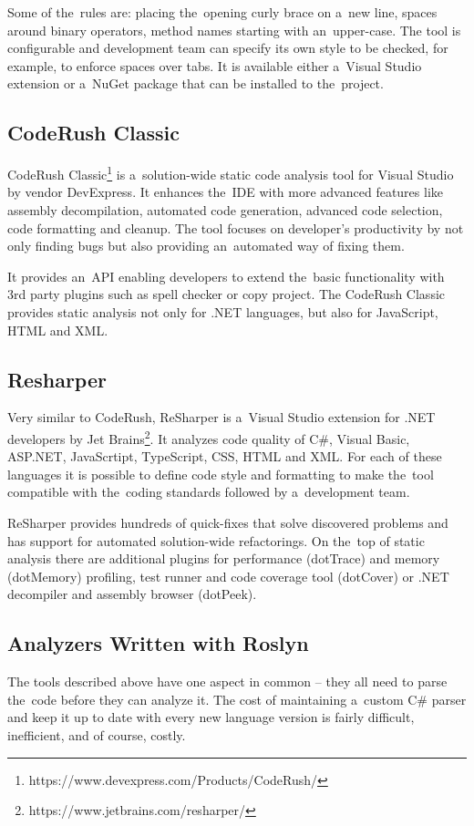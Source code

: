 \documentclass[
  digital, %
  table,   %
  lof,     %
  lot,     %
  oneside,
]{fithesis3}
\begin{document}
Some of the~rules are: placing the~opening curly brace on a~new line, spaces around binary operators, method names starting with an~upper-case. The tool is configurable and development team can specify its own style to be checked, for example, to enforce spaces over tabs. It is available either a~Visual Studio extension or a~NuGet package that can be installed to the~project.

\subsection{CodeRush Classic}
CodeRush Classic\footnote{https://www.devexpress.com/Products/CodeRush/} is a~solution-wide static code analysis tool for Visual Studio by vendor DevExpress. It enhances the~IDE with more advanced features like assembly decompilation, automated code generation, advanced code selection, code formatting and cleanup. The tool focuses on developer's productivity by not only finding bugs but also providing an~automated way of fixing them.

It provides an~API enabling developers to extend the~basic functionality with 3rd party plugins such as spell checker or copy project. The CodeRush Classic provides static analysis not only for .NET languages, but also for JavaScript, HTML and XML.

\subsection{Resharper}
Very similar to CodeRush, ReSharper is a~Visual Studio extension for .NET developers by Jet Brains\footnote{https://www.jetbrains.com/resharper/}. It analyzes code quality of C\#, Visual Basic, ASP.NET, JavaScrtipt, TypeScript, CSS, HTML and XML. For each of these languages it is possible to define code style and formatting to make the~tool compatible with the~coding standards followed by a~development team. 

ReSharper provides hundreds of quick-fixes that solve discovered problems and has support for automated solution-wide refactorings. On the~top of static analysis there are additional plugins for performance (dotTrace) and memory (dotMemory) profiling, test runner and code coverage tool (dotCover) or .NET decompiler and assembly browser (dotPeek).


\subsection{Analyzers Written with Roslyn}
The tools described above have one aspect in common -- they all need to parse the~code before they can analyze it. The cost of maintaining a~custom C\# parser and keep it up to date with every new language version is fairly difficult, inefficient, and of course, costly. 
\end{document}
